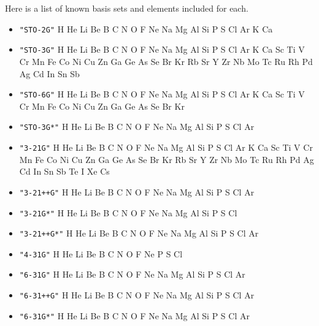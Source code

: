 \sloppy
Here is a list of known basis sets and elements included for each.
\begin{itemize}
\item \verb#"STO-2G"# \newline
 H He Li Be B C N O F Ne Na Mg Al Si P S Cl Ar K Ca

\item \verb#"STO-3G"# \newline
 H He Li Be B C N O F Ne Na Mg Al Si P S Cl Ar K Ca Sc Ti V Cr Mn Fe Co
 Ni Cu Zn Ga Ge As Se Br Kr Rb Sr Y Zr Nb Mo Tc Ru Rh Pd Ag Cd In Sn Sb

\item \verb#"STO-6G"# \newline
 H He Li Be B C N O F Ne Na Mg Al Si P S Cl Ar K Ca Sc Ti V Cr Mn Fe Co
 Ni Cu Zn Ga Ge As Se Br Kr

\item \verb#"STO-3G*"# \newline
 H He Li Be B C N O F Ne Na Mg Al Si P S Cl Ar

\item \verb#"3-21G"# \newline
 H He Li Be B C N O F Ne Na Mg Al Si P S Cl Ar K Ca Sc Ti V Cr Mn Fe Co
 Ni Cu Zn Ga Ge As Se Br Kr Rb Sr Y Zr Nb Mo Tc Ru Rh Pd Ag Cd In Sn Sb
 Te I Xe Cs

\item \verb#"3-21++G"# \newline
 H He Li Be B C N O F Ne Na Mg Al Si P S Cl Ar

\item \verb#"3-21G*"# \newline
 H He Li Be B C N O F Ne Na Mg Al Si P S Cl

\item \verb#"3-21++G*"# \newline
 H He Li Be B C N O F Ne Na Mg Al Si P S Cl Ar

\item \verb#"4-31G"# \newline
 H He Li Be B C N O F Ne P S Cl

\item \verb#"6-31G"# \newline
 H He Li Be B C N O F Ne Na Mg Al Si P S Cl Ar

\item \verb#"6-31++G"# \newline
 H He Li Be B C N O F Ne Na Mg Al Si P S Cl Ar

\item \verb#"6-31G*"# \newline
 H He Li Be B C N O F Ne Na Mg Al Si P S Cl Ar


\end{itemize}
